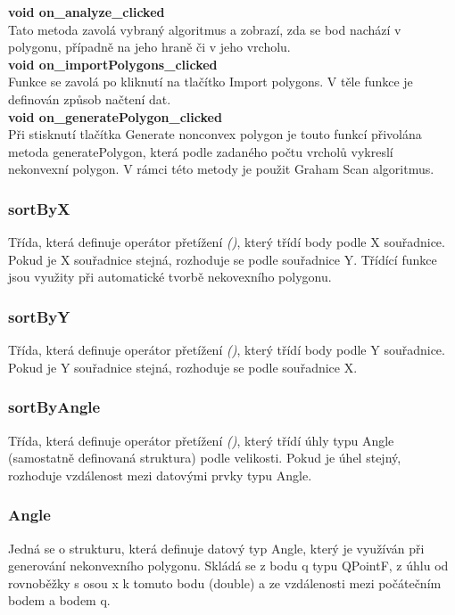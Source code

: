 \documentclass[a4paper,11pt,twoside]{article}
\begin{document}
\noindent\textbf{void on\_analyze\_clicked}\\
Tato metoda zavolá vybraný algoritmus a zobrazí, zda se bod nachází v polygonu, případně na jeho hraně či v jeho vrcholu.\\

\noindent\textbf{void on\_importPolygons\_clicked}\\
Funkce se zavolá po kliknutí na tlačítko Import polygons. V těle funkce je definován způsob načtení dat.\\

\noindent\textbf{void on\_generatePolygon\_clicked}\\
Při stisknutí tlačítka Generate nonconvex polygon je touto funkcí přivolána metoda generatePolygon, která podle zadaného počtu vrcholů vykreslí nekonvexní polygon. V rámci této metody je použit Graham Scan algoritmus.

\subsubsection{sortByX}
Třída, která definuje operátor přetížení \textit{()}, který třídí body podle X souřadnice. Pokud je X souřadnice stejná, rozhoduje se podle souřadnice Y. Třídící funkce jsou využity při automatické tvorbě nekovexního polygonu.

\subsubsection{sortByY}
Třída, která definuje operátor přetížení \textit{()}, který třídí body podle Y souřadnice. Pokud je Y souřadnice stejná, rozhoduje se podle souřadnice X.

\subsubsection{sortByAngle}
Třída, která definuje operátor přetížení \textit{()}, který třídí úhly typu Angle (samostatně definovaná struktura) podle velikosti. Pokud je úhel stejný, rozhoduje vzdálenost mezi datovými prvky typu Angle.

\subsubsection{Angle}
Jedná se o strukturu, která definuje datový typ Angle, který je využíván při generování nekonvexního polygonu. Skládá se z bodu q typu QPointF, z úhlu od rovnoběžky s osou x k tomuto bodu (double) a ze vzdálenosti mezi počátečním bodem a bodem q.
\end{document}
